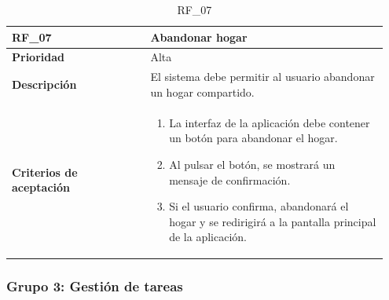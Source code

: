 \begin{table}[htb!]
    \begin{tabular}{|p{0.35\linewidth}|p{0.6\linewidth}|}
        \hline
        \rowcolor[HTML]{C0C0C0}  
        \textbf{RF\_07} & \textbf{Abandonar hogar} \\
        \hline
        \textbf{Prioridad} & Alta \\
        \hline
        \textbf{Descripción} & El sistema debe permitir al usuario abandonar un hogar compartido.  \\
        \hline
        \vspace{0.5mm}
        \textbf{Criterios de aceptación} & 
        \begin{minipage}[t]{0.9\linewidth}
            \begin{enumerate}
                \item La interfaz de la aplicación debe contener un botón para abandonar el hogar.
                \item Al pulsar el botón, se mostrará un mensaje de confirmación.
                \item Si el usuario confirma, abandonará el hogar y se redirigirá a la pantalla principal de la aplicación.
            \end{enumerate}
            \vspace{2mm}
        \end{minipage} \\
        \hline
    \end{tabular}
    \caption{RF\_07}

\end{table}

\clearpage

\subsubsection{Grupo 3: Gestión de tareas}
\label{subsubsec:grupo3}

